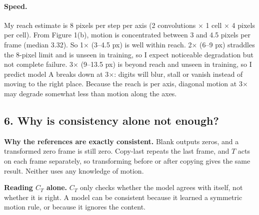 \documentclass[11pt, a4paper]{article}
\begin{document}
\paragraph{Speed.}
My reach estimate is 8 pixels per step per axis (2 convolutions $\times$ 1 cell $\times$ 4 pixels per cell). From Figure 1(b), motion is concentrated between 3 and 4.5 pixels per frame (median 3.32). So 1$\times$ (3--4.5 px) is well within reach. 2$\times$ (6--9 px) straddles the 8-pixel limit and is unseen in training, so I expect noticeable degradation but not complete failure. 3$\times$ (9--13.5 px) is beyond reach and unseen in training, so I predict model A breaks down at 3$\times$: digits will blur, stall or vanish instead of moving to the right place. Because the reach is per axis, diagonal motion at 3$\times$ may degrade somewhat less than motion along the axes.

\subsection*{6. Why is consistency alone not enough?}

\begin{table}[H]
\centering
\caption{Consistency gap $C_T$ and transformed error $E_T$ at 1$\times$, $t=1$, on the test set. Model A: mean (seed 0, seed 1).}
\label{tab:3}
\end{table}

\textbf{Why the references are exactly consistent.} Blank outputs zeros, and a transformed zero frame is still zero. Copy-last repeats the last frame, and $T$ acts on each frame separately, so transforming before or after copying gives the same result. Neither uses any knowledge of motion.

\textbf{Reading $C_T$ alone.} $C_T$ only checks whether the model agrees with itself, not whether it is right. A model can be consistent because it learned a symmetric motion rule, or because it ignores the content.
\end{document}
